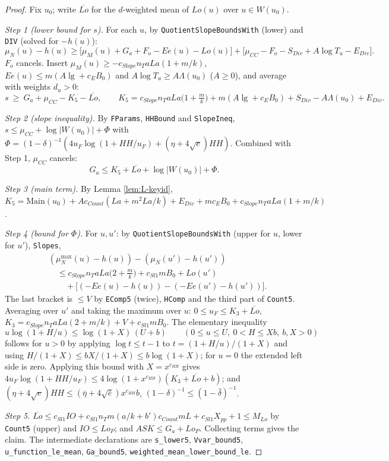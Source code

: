 \begin{proof}
Fix $u_0$; write $\overline{Lo}$ for the $d$-weighted mean of $Lo(u)$ over $u\in W(u_0)$.

\emph{Step 1 (lower bound for $s$).} For each $u$, by \texttt{QuotientSlopeBoundsWith} (lower) and
\texttt{DIV} (solved for $-h(u)$):
\[
 \mu_N(u)-h(u)\ge\bigl[\mu_M(u)+G_a+F_o-Ee(u)-Lo(u)\bigr]+\bigl[\mu_{CC}-F_o-S_{Div}+A\log T_u-E_{Div}\bigr].
\]
$F_o$ cancels. Insert $\mu_M(u)\ge-c_{Slope}n_TaLa(1+m/k)$, $Ee(u)\le m(A\lg+c_EB_0)$ and
$A\log T_u\ge A\Lambda(u_0)$ ($A\ge0$), and average with weights $d_u>0$:
\[
  s\ \ge\ G_a+\mu_{CC}-K_5-\overline{Lo},\qquad
  K_5=c_{Slope}n_TaLa\bigl(1+\tfrac mk\bigr)+m(A\lg+c_EB_0)+S_{Div}-A\Lambda(u_0)+E_{Div}.
\]

\emph{Step 2 (slope inequality).} By \texttt{FParams}, \texttt{HHBound} and \texttt{SlopeIneq},
$s\le\mu_{CC}+\log|W(u_0)|+\Phi$ with
$\Phi=(1-\delta)^{-1}(4u_F\log(1+HH/u_F)+(\eta+4\sqrt e)HH)$. Combined with Step 1, $\mu_{CC}$ cancels:
\[
  G_a\le K_5+\overline{Lo}+\log|W(u_0)|+\Phi .
\]

\emph{Step 3 (main term).} By Lemma \ref{lem:L-keyid},
$K_5=\mathrm{Main}(u_0)+Ac_{Count}(La+m^2La/k)+E_{Div}+mc_EB_0+c_{Slope}n_TaLa(1+m/k)$.

\emph{Step 4 (bound for $\Phi$).} For $u,u'$: by \texttt{QuotientSlopeBoundsWith} (upper for $u$, lower
for $u'$), \texttt{Slopes},
\[
\begin{aligned}
 &(\mu_N^{\max}(u)-h(u))-(\mu_N(u')-h(u'))\\
 &\quad\le c_{Slope}n_TaLa\bigl(2+\tfrac mk\bigr)+c_{Sl1}mB_0+Lo(u')\\
 &\qquad+\bigl[(-Ee(u)-h(u))-(-Ee(u')-h(u'))\bigr].
\end{aligned}
\]
The last bracket is $\le V$ by \texttt{EComp5} (twice), \texttt{HComp} and the third part of
\texttt{Count5}. Averaging over $u'$ and taking the maximum over $u$:
$0\le u_F\le K_3+\overline{Lo}$, $K_3=c_{Slope}n_TaLa(2+m/k)+V+c_{Sl1}mB_0$. The elementary inequality
\[
  u\log(1+H/u)\le\log(1+X)\,(U+b)\qquad(0\le u\le U,\ 0<H\le Xb,\ b,X>0)
\]
follows for $u>0$ by applying $\log t\le t-1$ to $t=(1+H/u)/(1+X)$ and using
$H/(1+X)\le bX/(1+X)\le b\log(1+X)$; for $u=0$ the extended left side is zero.
Applying this bound with $X=x^{c_{HH}}$ gives
$4u_F\log(1+HH/u_F)\le4\log(1+x^{c_{HH}})(K_3+\overline{Lo}+b)$; and
$(\eta+4\sqrt e)HH\le(\bar\eta+4\sqrt{\bar e})x^{c_{HH}}b$, $(1-\delta)^{-1}\le(1-\bar\delta)^{-1}$.

\emph{Step 5.} $\overline{Lo}\le c_{Sl1}IO+c_{Sl1}n_Tm(a/k+b')c_{Count}mL+c_{Sl1}X_{pp}+1\le M_{Lo}$
by \texttt{Count5} (upper) and $IO\le Lo_P$; and $ASK\le G_a+Lo_P$. Collecting terms gives the claim.
The intermediate declarations are \texttt{s\_lower5}, \texttt{Vvar\_bound5}, \texttt{u\_function\_le\_mean}, \texttt{Ga\_bound5},
\texttt{weighted\_mean\_lower\_bound\_le}. 
\end{proof}
